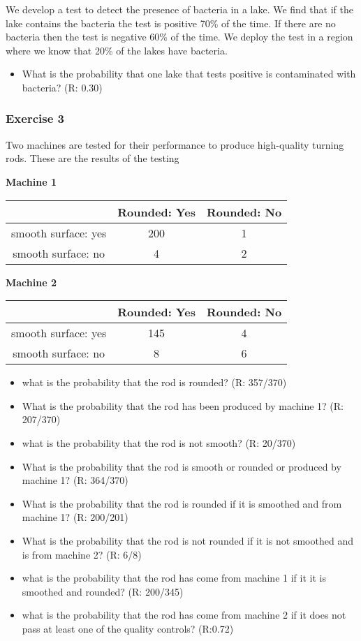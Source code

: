 \documentclass[
]{book}
\providecommand{\tightlist}{%
  \setlength{\itemsep}{0pt}\setlength{\parskip}{0pt}}
\begin{document}
We develop a test to detect the presence of bacteria in a lake. We find that if the lake contains the bacteria the test is positive 70\% of the time. If there are no bacteria then the test is negative 60\% of the time. We deploy the test in a region where we know that 20\% of the lakes have bacteria.

\begin{itemize}
\tightlist
\item
  What is the probability that one lake that tests positive is contaminated with bacteria? (R: 0.30)
\end{itemize}

\hypertarget{exercise-3}{%
\subsubsection{Exercise 3}\label{exercise-3}}

Two machines are tested for their performance to produce high-quality turning rods. These are the results of the testing

\textbf{Machine 1}

\begin{longtable}[]{@{}ccc@{}}
\toprule
& Rounded: Yes & Rounded: No \\
\midrule
\endhead
smooth surface: yes & 200 & 1 \\
smooth surface: no & 4 & 2 \\
\bottomrule
\end{longtable}

\textbf{Machine 2}

\begin{longtable}[]{@{}ccc@{}}
\toprule
& Rounded: Yes & Rounded: No \\
\midrule
\endhead
smooth surface: yes & 145 & 4 \\
smooth surface: no & 8 & 6 \\
\bottomrule
\end{longtable}

\begin{itemize}
\tightlist
\item
  what is the probability that the rod is rounded? (R: 357/370)
\item
  What is the probability that the rod has been produced by machine 1? (R: 207/370)
\item
  what is the probability that the rod is not smooth? (R: 20/370)
\item
  What is the probability that the rod is smooth or rounded or produced by machine 1? (R: 364/370)
\item
  What is the probability that the rod is rounded if it is smoothed and from machine 1? (R: 200/201)
\item
  What is the probability that the rod is not rounded if it is not smoothed and is from machine 2? (R: 6/8)
\item
  what is the probability that the rod has come from machine 1 if it it is smoothed and rounded? (R: 200/345)
\item
  what is the probability that the rod has come from machine 2 if it does not pass at least one of the quality controls? (R:0.72)
\end{itemize}
\end{document}
